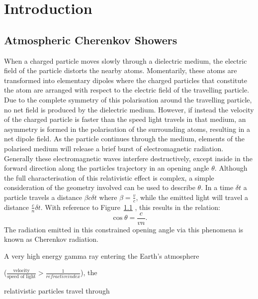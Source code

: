 \chapter{\label{ch1-intro}Introduction} 

\minitoc

\section{Atmospheric Cherenkov Showers}

When a charged particle moves slowly through a dielectric medium, the electric field of the particle distorts the nearby atoms. Momentarily, these atoms are transformed into elementary dipoles where the charged particles that constitute the atom are arranged with respect to the electric field of the travelling particle. Due to the complete symmetry of this polarisation around the travelling particle, no net field is produced by the dielectric medium. However, if instead the velocity of the charged particle is faster than the speed light travels in that medium, an asymmetry is formed in the polarisation of the surrounding atoms, resulting in a net dipole field. As the particle continues through the medium, elements of the polarised medium will release a brief burst of electromagnetic radiation. Generally these electromagnetic waves interfere destructively, except inside in the forward direction along the particles trajectory in an opening angle $\theta$. Although the full characterisation of this relativistic effect is complex, a simple consideration of the geometry involved can be used to describe $\theta$. In a time $\delta t$ a particle travels a distance $\beta c \delta t$ where $\beta = \frac{v}{c}$, while the emitted light will travel a distance $\frac{c}{n} \delta t$. With reference to Figure~\ref{} , this results in the relation:
\begin{equation} \label{eq:cherenkov_angle}
\cos \theta = \frac{c}{vn}.
\end{equation}
The radiation emitted in this constrained opening angle via this phenomena is known as Cherenkov radiation.

A very high energy gamma ray entering the Earth's atmosphere 




($\frac{\text{velocity}}{\text{speed of light}} > \frac{1}{refractive index}$), the  

relativistic particles travel through 




